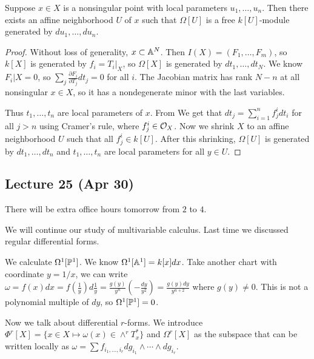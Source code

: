 \documentclass[twoside, 10pt]{article}
\begin{document}
        \begin{thm}
            Suppose $x \in X$ is a nonsingular point with local parameters $u_1, \ldots, u_n$. Then there exists an affine neighborhood $U$ of $x$ such that $\Omega[U]$ is a free $k[U]$-module generated by $du_1, \ldots, du_n$.
            \begin{proof}
                Without loss of generality, $x \subset \A^N$. Then $I(X) = (F_1, \ldots, F_m)$, so $k[X]$ is generated by $f_i = T_i|_X$, so $\Omega[X]$ is generated by $dt_1, \ldots, dt_N$. We know $F_i|X = 0$, so $\sum_j \frac{\partial F_i}{\partial T_j} dt_j = 0$ for all $i$. The Jacobian matrix has rank $N-n$ at all nonsingular $x \in X$, so it has a nondegenerate minor with the last variables.

                Thus $t_1, \ldots, t_n$ are local parameters of $x$. From We get that $dt_j = \sum_{i=1}^n f^i_j dt_i$ for all $j > n$ using Cramer's rule, where $f_j^i \in \mc{O}_X$. Now we shrink $X$ to an affine neighborhood $U$ such that all $f_j^i \in k[U]$. After this shrinking, $\Omega[U]$ is generated by $dt_1, \ldots, dt_n$ and $t_1, \ldots, t_n$ are local parameters for all $y \in U$.
            \end{proof}
        \end{thm}

        \subsection{Lecture 25 (Apr 30)}
        There will be extra office hours tomorrow from $2$ to $4$.

        We will continue our study of multivariable calculus. Last time we discussed regular differential forms. 
        
        \begin{exm}
            We calculate $\Omega^1[\P^1]$. We know $\Omega^1[\A^1] = k[x] dx$. Take another chart with coordinate $y = 1/x$, we can write $\omega = f(x) dx = f \left( \frac{1}{y} \right) d \frac{1}{y} = \frac{g(y)}{y^n} \left( -\frac{dy}{y^2} \right) = \frac{g(y) dy}{y^{n+2}}$ where $g(y) \neq 0$. This is not a polynomial multiple of $dy$, so $\Omega^1[\P^1] = 0$.
        \end{exm}

        Now we talk about differential $r$-forms. We introduce $\Phi^r[X] = \{ x \in X \mapsto \omega(x) \in \land^r T_x^*\}$ and $\Omega^r[X]$ as the subspace that can be written locally as $\omega = \sum f_{i_1, \ldots, i_r} dg_{i_1} \land \cdots \land dg_{i_r}$.
\end{document}
